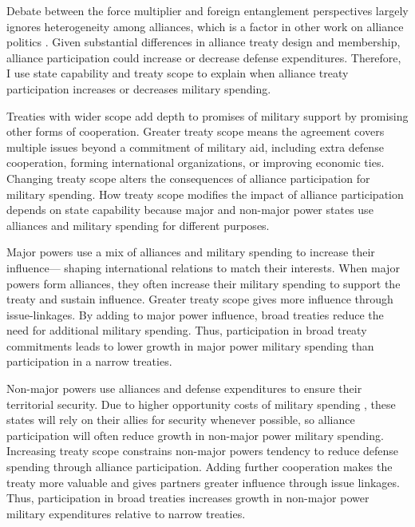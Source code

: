 \documentclass[12pt]{article}
\begin{document}
Debate between the force multiplier and foreign entanglement perspectives largely ignores heterogeneity among alliances, which is a factor in other work on alliance politics \citep{Morrow1991, Leeds2003, LeedsAnac2005, Fordham2010, Mattes2012, Benson2012, Poast2013, Johnsonetal2015}.  
Given substantial differences in alliance treaty design and membership, alliance participation could increase or decrease defense expenditures. 
Therefore, I use state capability and treaty scope to explain when alliance treaty participation increases or decreases military spending. 


Treaties with wider scope add depth to promises of military support by promising other forms of cooperation.
Greater treaty scope means the agreement covers multiple issues beyond a commitment of military aid, including extra defense cooperation, forming international organizations, or improving economic ties.  
Changing treaty scope alters the consequences of alliance participation for military spending. 
How treaty scope modifies the impact of alliance participation depends on state capability because major and non-major power states use alliances and military spending for different purposes. 


Major powers use a mix of alliances and military spending to increase their influence--- shaping international relations to match their interests.
When major powers form alliances, they often increase their military spending to support the treaty and sustain influence. 
Greater treaty scope gives more influence through issue-linkages.
By adding to major power influence, broad treaties reduce the need for additional military spending. 
Thus, participation in broad treaty commitments leads to lower growth in major power military spending than participation in a narrow treaties.  


Non-major powers use alliances and defense expenditures to ensure their territorial security.
Due to higher opportunity costs of military spending \citep{Powell1993, Fearon2018}, these states will rely on their allies for security whenever possible, so alliance participation will often reduce growth in non-major power military spending.   
Increasing treaty scope constrains non-major powers tendency to reduce defense spending through alliance participation. 
Adding further cooperation makes the treaty more valuable and gives partners greater influence through issue linkages. 
Thus, participation in broad treaties increases growth in non-major power military expenditures relative to narrow treaties. 
\end{document}
